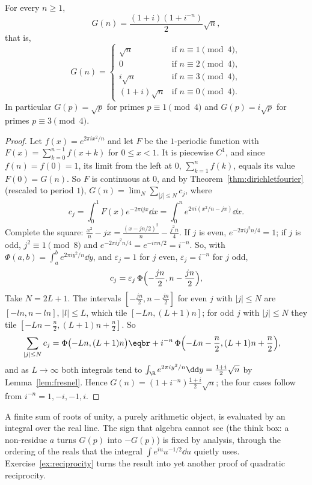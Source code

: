 \begin{theorem}[Gauss, 1805]\label{thm:gausssign}
For every $n\ge1$,
\[
G(n)=\frac{(1+i)(1+i^{-n})}2\sqrt n,
\]
that is,
\[
G(n)=\begin{cases}\sqrt n&\text{if }n\equiv1\pmod4,\\0&\text{if }n\equiv2\pmod4,\\i\sqrt n&\text{if }n\equiv3\pmod4,\\(1+i)\sqrt n&\text{if }n\equiv0\pmod4.\end{cases}
\]
In particular $G(p)=\sqrt p$ for primes $p\equiv1\pmod4$ and $G(p)=i\sqrt p$ for primes $p\equiv3\pmod4$.
\end{theorem}
\begin{proof}
Let $f(x)=e^{2\pi ix^2/n}$ and let $F$ be the $1$-periodic function with $F(x)=\sum_{k=0}^{n-1}f(x+k)$ for $0\le x<1$. It is piecewise $C^1$, and since
$f(n)=f(0)=1$, its limit from the left at $0$, $\sum_{k=1}^nf(k)$, equals its value $F(0)=G(n)$. So $F$ is continuous at $0$, and by
Theorem~\ref{thm:dirichletfourier} (rescaled to period $1$), $G(n)=\lim_N\sum_{|j|\le N}c_j$, where
\[
c_j=\int_0^1F(x)e^{-2\pi ijx}\dd x=\int_0^ne^{2\pi i(x^2/n-jx)}\dd x.
\]
Complete the square: $\frac{x^2}n-jx=\frac{(x-jn/2)^2}n-\frac{j^2n}4$. If $j$ is even, $e^{-2\pi ij^2n/4}=1$; if $j$ is odd, $j^2\equiv1\pmod8$ and $e^{-2\pi ij^2n/4}=e^{-i\pi n/2}=i^{-n}$.
So, with $\Phi(a,b)=\int_a^be^{2\pi iy^2/n}\dd y$, and $\varepsilon_j=1$ for $j$ even, $\varepsilon_j=i^{-n}$ for $j$ odd,
\[
c_j=\varepsilon_j\,\Phi\Bigl(-\frac{jn}2,n-\frac{jn}2\Bigr),
\]
Take $N=2L+1$. The intervals $[-\frac{jn}2,n-\frac{jn}2]$ for even $j$ with $|j|\le N$ are $[-ln,n-ln]$, $|l|\le L$, which tile $[-Ln,(L+1)n]$; for odd $j$ with $|j|\le N$
they tile $[-Ln-\frac n2,(L+1)n+\frac n2]$. So
\[
\begin{aligned}\sum_{|j|\le N}c_j&=\Phi\bigl(-Ln,(L+1)n\bigr)\eqbr+i^{-n}\,\Phi\Bigl(-Ln-\frac n2,(L+1)n+\frac n2\Bigr),\end{aligned}
\]
and as $L\to\infty$ both integrals tend to $\int_{\R}e^{2\pi iy^2/n}\dd y=\frac{1+i}2\sqrt n$ by Lemma~\ref{lem:fresnel}. Hence $G(n)=(1+i^{-n})\frac{1+i}2\sqrt n$; the
four cases follow from $i^{-n}=1,-i,-1,i$.
\end{proof}

\begin{beauty}
A finite sum of roots of unity, a purely arithmetic object, is evaluated by an integral over the real line. The sign
that algebra cannot see (the think box: a non-residue $a$ turns $G(p)$ into $-G(p)$) is fixed by analysis, through the
ordering of the reals that the integral $\int e^{iu}u^{-1/2}\dd u$ quietly uses. Exercise~\ref{ex:reciprocity} turns the result into
yet another proof of quadratic reciprocity.
\end{beauty}

